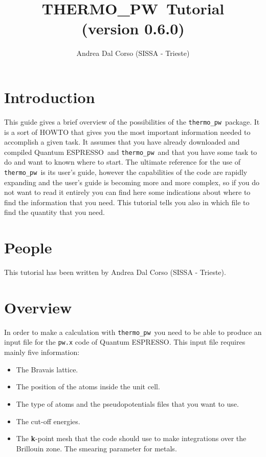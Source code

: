 \documentclass[12pt,a4paper]{article}
\def\version{0.6.0}
\def\qe{{\sc Quantum ESPRESSO}}
\def\tpw{{\sc THERMO\_PW}}
\def\thermo{\texttt{thermo\_pw}}
\begin{document}
 
\author{Andrea Dal Corso (SISSA - Trieste)}
\date{}


\title{
  \vskip 1cm
  {\color{red} \Huge \tpw\ Tutorial} \\
  \Large (version \version)
}

\maketitle

\tableofcontents

\newpage

\section{\color{coral}Introduction}

This guide gives a brief overview of the possibilities of the \thermo\ package. 
It is a sort of HOWTO that gives you the most important information needed 
to accomplish a given task.
It assumes that you have already downloaded and compiled \qe\ and \thermo\  
and that you have some task to do and want to known where to start. 
The ultimate reference for the use of \thermo\ is its user's guide,
however the capabilities of the code are rapidly expanding and the 
user's guide is becoming more and more complex, so if you do not want
to read it entirely you can find here some indications about where
to find the information that you need.
This tutorial tells you also in which file to find the quantity that you need.

\section{\color{coral}People}
This tutorial has been written by Andrea Dal Corso (SISSA - Trieste). 

\section{\color{coral}Overview}

In order to make a calculation with \thermo\ you need to be able to 
produce an input file for the \texttt{pw.x} code of \qe. This input file
requires mainly five information:
\begin{itemize}
\item The Bravais lattice.

\item The position of the atoms inside the unit cell.

\item The type of atoms and the pseudopotentials files that you want to use.

\item The cut-off energies.

\item The {\bf k}-point mesh that the code should use to make integrations over
the Brillouin zone. The smearing parameter for metals. 
\end{itemize}
\end{document}

